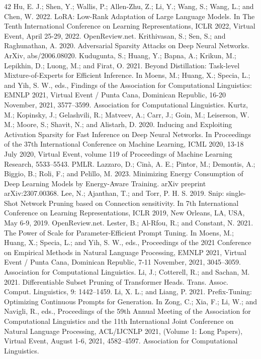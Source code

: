 \documentclass[11pt,a4paper]{article}
\begin{document}
\begin{thebibliography}{42}
 Hu, E. J.; Shen, Y.; Wallis, P.; Allen-Zhu, Z.; Li, Y.; Wang, S.; Wang, L.; and Chen, W. 2022. LoRA: Low-Rank Adaptation of Large Language Models. In The Tenth International Conference on Learning Representations, ICLR 2022, Virtual Event, April 25-29, 2022. OpenReview.net.
 Krithivasan, S.; Sen, S.; and Raghunathan, A. 2020. Adversarial Sparsity Attacks on Deep Neural Networks. ArXiv, abs/2006.08020.
 Kudugunta, S.; Huang, Y.; Bapna, A.; Krikun, M.; Lepikhin, D.; Luong, M.; and Firat, O. 2021. Beyond Distillation: Task-level Mixture-of-Experts for Efficient Inference. In Moens, M.; Huang, X.; Specia, L.; and Yih, S. W., eds., Findings of the Association for Computational Linguistics: EMNLP 2021, Virtual Event / Punta Cana, Dominican Republic, 16-20 November, 2021, 3577–3599. Association for Computational Linguistics.
 Kurtz, M.; Kopinsky, J.; Gelashvili, R.; Matveev, A.; Carr, J.; Goin, M.; Leiserson, W. M.; Moore, S.; Shavit, N.; and Alistarh, D. 2020. Inducing and Exploiting Activation Sparsity for Fast Inference on Deep Neural Networks. In Proceedings of the 37th International Conference on Machine Learning, ICML 2020, 13-18 July 2020, Virtual Event, volume 119 of Proceedings of Machine Learning Research, 5533–5543. PMLR.
 Lazzaro, D.; Cinà, A. E.; Pintor, M.; Demontis, A.; Biggio, B.; Roli, F.; and Pelillo, M. 2023. Minimizing Energy Consumption of Deep Learning Models by Energy-Aware Training. arXiv preprint arXiv:2307.00368.
 Lee, N.; Ajanthan, T.; and Torr, P. H. S. 2019. Snip: single-Shot Network Pruning based on Connection sensitivity. In 7th International Conference on Learning Representations, ICLR 2019, New Orleans, LA, USA, May 6-9, 2019. OpenReview.net.
 Lester, B.; Al-Rfou, R.; and Constant, N. 2021. The Power of Scale for Parameter-Efficient Prompt Tuning. In Moens, M.; Huang, X.; Specia, L.; and Yih, S. W., eds., Proceedings of the 2021 Conference on Empirical Methods in Natural Language Processing, EMNLP 2021, Virtual Event / Punta Cana, Dominican Republic, 7-11 November, 2021, 3045–3059. Association for Computational Linguistics.
 Li, J.; Cotterell, R.; and Sachan, M. 2021. Differentiable Subset Pruning of Transformer Heads. Trans. Assoc. Comput. Linguistics, 9: 1442–1459.
 Li, X. L.; and Liang, P. 2021. Prefix-Tuning: Optimizing Continuous Prompts for Generation. In Zong, C.; Xia, F.; Li, W.; and Navigli, R., eds., Proceedings of the 59th Annual Meeting of the Association for Computational Linguistics and the 11th International Joint Conference on Natural Language Processing, ACL/IJCNLP 2021, (Volume 1: Long Papers), Virtual Event, August 1-6, 2021, 4582–4597. Association for Computational Linguistics.

\end{thebibliography}
\end{document}
